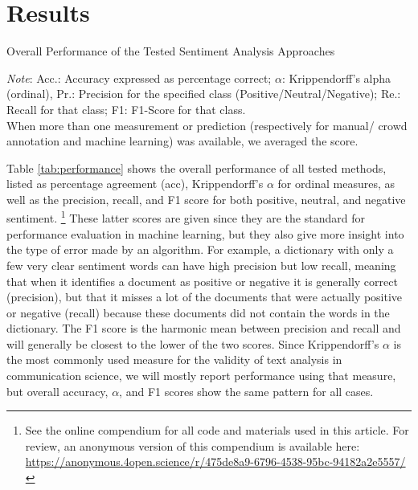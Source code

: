 \section{Results} 


\begin{table}[ht!]
  \caption{Overall Performance of the Tested Sentiment Analysis Approaches}\label{tab:performance}

\emph{Note}: Acc.: Accuracy expressed as percentage correct; $\alpha$: Krippendorff's alpha (ordinal), Pr.: Precision for the specified class (Positive/Neutral/Negative); Re.: Recall for that class; F1: F1-Score for that class.\\ When more than one measurement or prediction (respectively for manual/ crowd annotation and machine learning) was available, we averaged the score.
\end{table}

\noindent Table \ref{tab:performance} shows the overall performance of all tested methods, listed as percentage agreement (\textsf{acc}), Krippendorff's $\alpha$ for ordinal measures, as well as the precision, recall, and F1 score for both positive, neutral, and negative sentiment.%
\footnote{See the online compendium for all code and materials used in this article. For review, an anonymous version of this compendium is available here: \url{https://anonymous.4open.science/r/475de8a9-6796-4538-95bc-94182a2e5557/}}
These latter scores are given since they are the standard for performance evaluation in machine learning, 
but they also give more insight into the type of error made by an algorithm.
For example, a dictionary with only a few very clear sentiment words can have high precision but low recall,
meaning that when it identifies a document as positive or negative it is generally correct (precision),
but that it misses a lot of the documents that were actually positive or negative (recall) 
because these documents did not contain the words in the dictionary. 
The F1 score is the harmonic mean between precision and recall and will generally be closest to the lower of the two scores. 
Since Krippendorff's $\alpha$ is the most commonly used measure for the validity of text analysis in communication science,
we will mostly report performance using that measure, but overall accuracy, $\alpha$, and F1 scores show the same pattern for all cases. 

